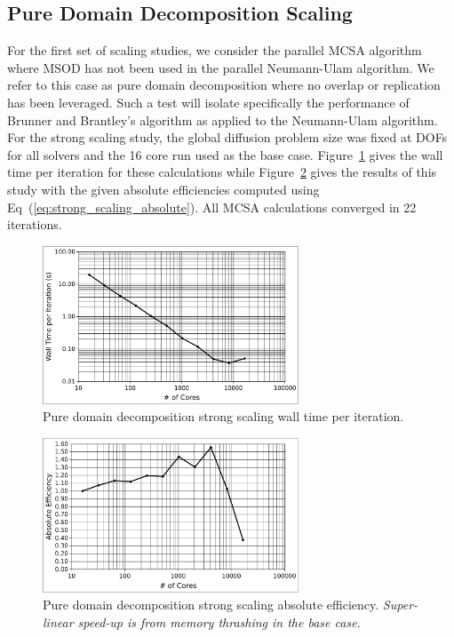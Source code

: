 \documentclass{snamc2013}
\begin{document}
\subsection{Pure Domain Decomposition Scaling}
\label{subsec:pure_domain_decomp}
For the first set of scaling studies, we consider the parallel MCSA
algorithm where MSOD has not been used in the parallel Neumann-Ulam
algorithm. We refer to this case as pure domain decomposition where no
overlap or replication has been leveraged. Such a test will isolate
specifically the performance of Brunner and Brantley's algorithm as
applied to the Neumann-Ulam algorithm. For the strong scaling study,
the global diffusion problem size was fixed at  DOFs for
all solvers and the 16 core run used as the base
case. Figure~\ref{fig:titan_pure_strong_time} gives the wall time per
iteration for these calculations while
Figure~\ref{fig:titan_pure_strong} gives the results of this study
with the given absolute efficiencies computed using
Eq~(\ref{eq:strong_scaling_absolute}). All MCSA calculations converged
in 22 iterations.

\begin{figure}[h!]
  \begin{center}
    \includegraphics[width=3in]{titan_pure_strong_time.pdf}
  \end{center}
  \caption{Pure domain decomposition strong scaling wall time per
    iteration.}
  \label{fig:titan_pure_strong_time}
\end{figure}

\begin{figure}[h!]
  \begin{center}
    \includegraphics[width=3in]{titan_pure_strong.pdf}
  \end{center}
  \caption{Pure domain decomposition strong scaling absolute
    efficiency. \textit{Super-linear speed-up is from memory thrashing
      in the base case.}}
  \label{fig:titan_pure_strong}
\end{figure}
\end{document}
